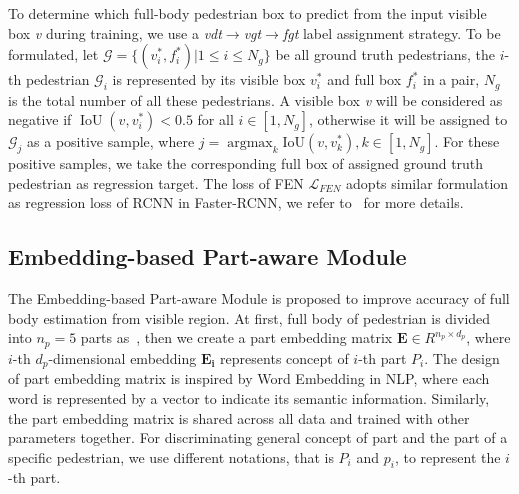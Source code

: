 \documentclass[10pt,twocolumn,letterpaper]{article}
\begin{document}
To determine which full-body pedestrian box to predict from the input visible box \textit{v} during training, we use a \textit{vdt$\xrightarrow{}$vgt$\xrightarrow{}$fgt} label assignment strategy. To be formulated, let $\mathcal{G}={\{(v_i^*, f_i^*)|1 \leq i \leq N_g \}}$ be all ground truth pedestrians, the $i$-th pedestrian $\mathcal{G}_i$ is represented by its visible box $v_i^*$ and full box $f_i^*$ in a pair, $N_g$ is the total number of all these pedestrians. A visible box \textit{v} will be considered as negative if $\operatorname{IoU}(v, v_i^*)<0.5$ for all $i \in [1, N_g]$, otherwise it will be assigned to $\mathcal{G}_j$ as a positive sample, where $j=\operatorname*{argmax}_k\mathrm{IoU}(v, v_k^*), k\in{[1, N_g]}$. For these positive samples, we take the corresponding full box of assigned ground truth pedestrian as regression target. The loss of FEN $\mathcal{L}_{FEN}$ adopts similar formulation as regression loss of RCNN in Faster-RCNN, we refer to~\cite{ren2015faster} for more details.


\subsection{Embedding-based Part-aware Module}
The Embedding-based Part-aware Module is proposed to improve accuracy of full body estimation from visible region. At first, full body of pedestrian is divided into $n_p=5$ parts as~\cite{zhang2018Occlusionaware}, then we create a part embedding matrix $\bm{E}\in R^{n_p\times d_p}$, where $i$-th $d_p$-dimensional embedding $\bm{E_i}$ represents concept of $i$-th part $P_i$. The design of part embedding matrix is inspired by Word Embedding in NLP, where each word is represented by a vector to indicate its semantic information. Similarly, the part embedding matrix is shared across all data and trained with other parameters together. For discriminating
general concept of part and the part of a specific pedestrian, we use different notations, that is $P_i$ and $p_i$, to represent the $i$-th part.
\end{document}

